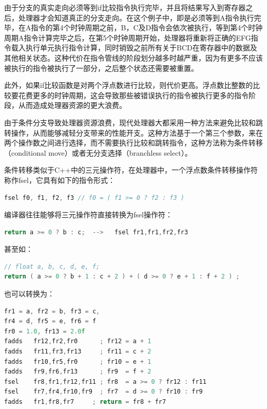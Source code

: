 由于分支的真实走向必须等到if比较指令执行完毕，并且将结果写入到寄存器之后，处理器才会知道真正的分支走向。在这个例子中，即是必须等到A指令执行完毕，在A指令的第4个时钟周期之前，B，C及D指令会依次被执行，等到第4个时钟周期A指令计算完毕之后，在第5个时钟周期开始，处理器将重新将正确的EFG指令载入执行单元执行指令计算，同时销毁之前所有关于BCD在寄存器中的数据及其他相关状态。这种代价在指令管线的阶段划分越多时越严重，因为有更多不应该被执行的指令被执行了一部分，之后整个状态还需要被重置。

此外，如果if比较函数是对两个浮点数进行比较，则代价更高。浮点数比整数的比较要花费更多的时钟周期，这会导致那些被错误执行的指令被执行更多的指令阶段，从而造成处理器资源的更大浪费。

由于条件分支导致处理器资源浪费，现代处理器大都采用一种方法来避免比较和跳转操作，从而能够减轻分支带来的性能开支。这种方法基于一个第三个参数，来在两个操作数之间进行选择，而不需要执行比较和跳转指令，这种方法称为条件转移（conditional move）或者无分支选择（branchless select）。

条件转移类似于C++中的三元操作符，在处理器中，一个浮点数条件转移操作符称作fsel，它具有如下的指令形式：

\begin{lstlisting}[language=C++]
fsel f0, f1, f2, f3 // f0 = ( f1 >= 0 ? f2 : f3 )
\end{lstlisting}

编译器往往能够将三元操作符直接转换为fsel操作符：

\begin{lstlisting}[language=C++]
	return a >= 0 ? b : c;	-->   fsel fr1,fr1,fr2,fr3
\end{lstlisting}

甚至如：

\begin{lstlisting}[language=C++]
// float a, b, c, d, e, f;
return ( a >= 0 ? b + 1 : c + 2 ) + ( d >= 0 ? e + 1 : f + 2 ) ;
\end{lstlisting}
也可以转换为：

\begin{lstlisting}[language=C++]
fr1 = a, fr2 = b, fr3 = c,
fr4 = d, fr5 = e, fr6 = f
fr0 = 1.0, fr13 = 2.0f
fadds   fr12,fr2,fr0      ; fr12 = a + 1
fadds   fr11,fr3,fr13     ; fr11 = c + 2
fadds   fr10,fr5,fr0      ; fr10 = e + 1
fadds   fr9,fr6,fr13      ; fr9  = f + 2
fsel    fr8,fr1,fr12,fr11 ; fr8  = a >= 0 ? fr12 : fr11
fsel    fr7,fr4,fr10,fr9  ; fr7  = d >= 0 ? fr10 : fr9
fadds   fr1,fr8,fr7     ; return = fr8 + fr7
\end{lstlisting}

